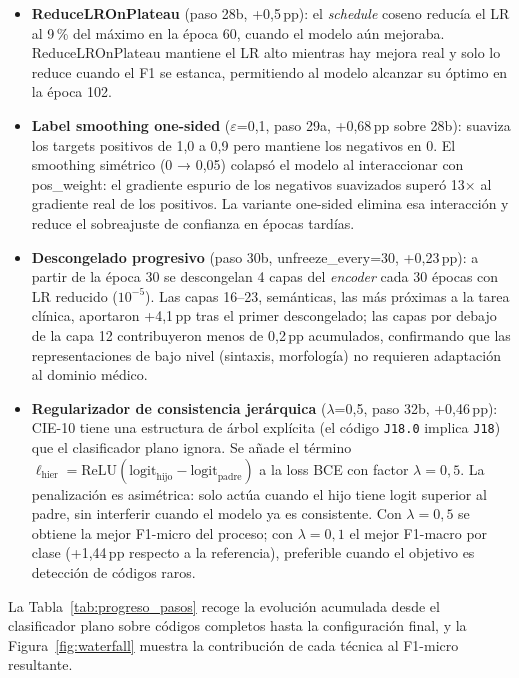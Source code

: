 \begin{itemize}
 \item \textbf{ReduceLROnPlateau} (paso 28b, +0,5\,pp): el \emph{schedule} coseno reducía el LR al 9\,\% del máximo en la época 60, cuando el modelo aún mejoraba. ReduceLROnPlateau mantiene el LR alto mientras hay mejora real y solo lo reduce cuando el F1 se estanca, permitiendo al modelo alcanzar su óptimo en la época 102.

 \item \textbf{Label smoothing one-sided} ($\varepsilon$=0,1, paso 29a, +0,68\,pp sobre 28b): suaviza los targets positivos de 1,0 a 0,9 pero mantiene los negativos en 0. El smoothing simétrico (0 → 0,05) colapsó el modelo al interaccionar con pos\_weight: el gradiente espurio de los negativos suavizados superó 13× al gradiente real de los positivos. La variante one-sided elimina esa interacción y reduce el sobreajuste de confianza en épocas tardías.

 \item \textbf{Descongelado progresivo} (paso 30b, unfreeze\_every=30, +0,23\,pp): a partir de la época 30 se descongelan 4 capas del \emph{encoder} cada 30 épocas con LR reducido ($10^{-5}$). Las capas 16--23, semánticas, las más próximas a la tarea clínica, aportaron +4,1\,pp tras el primer descongelado; las capas por debajo de la capa 12 contribuyeron menos de 0,2\,pp acumulados, confirmando que las representaciones de bajo nivel (sintaxis, morfología) no requieren adaptación al dominio médico.

 \item \textbf{Regularizador de consistencia jerárquica} ($\lambda$=0,5, paso 32b, +0,46\,pp): CIE-10 tiene una estructura de árbol explícita (el código \texttt{J18.0} implica \texttt{J18}) que el clasificador plano ignora. Se añade el término $\ell_\text{hier} = \text{ReLU}(\text{logit}_\text{hijo} - \text{logit}_\text{padre})$ a la loss BCE con factor $\lambda=0{,}5$. La penalización es asimétrica: solo actúa cuando el hijo tiene logit superior al padre, sin interferir cuando el modelo ya es consistente. Con $\lambda=0{,}5$ se obtiene la mejor F1-micro del proceso; con $\lambda=0{,}1$ el mejor F1-macro por clase (+1,44\,pp respecto a la referencia), preferible cuando el objetivo es detección de códigos raros.
\end{itemize}

La Tabla~\ref{tab:progreso_pasos} recoge la evolución acumulada desde el clasificador plano sobre códigos completos hasta la configuración final, y la Figura~\ref{fig:waterfall} muestra la contribución de cada técnica al F1-micro resultante.

